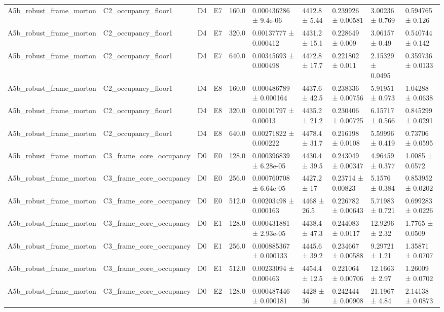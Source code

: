 \begin{table}
\begin{tabular}{llllllllll}
A5b\_robust\_frame\_morton & C2\_occupancy\_floor1 & D4 & E7 & 160.0 & 0.000436286 ± 9.4e-06 & 4412.8 ± 5.44 & 0.239926 ± 0.00581 & 3.00236 ± 0.769 & 0.594765 ± 0.126 \\
A5b\_robust\_frame\_morton & C2\_occupancy\_floor1 & D4 & E7 & 320.0 & 0.00137777 ± 0.000412 & 4431.2 ± 15.1 & 0.228649 ± 0.009 & 3.06157 ± 0.49 & 0.540744 ± 0.142 \\
A5b\_robust\_frame\_morton & C2\_occupancy\_floor1 & D4 & E7 & 640.0 & 0.00345693 ± 0.000498 & 4472.8 ± 17.7 & 0.221802 ± 0.011 & 2.15329 ± 0.0495 & 0.359736 ± 0.0133 \\
A5b\_robust\_frame\_morton & C2\_occupancy\_floor1 & D4 & E8 & 160.0 & 0.000486789 ± 0.000164 & 4437.6 ± 42.5 & 0.238336 ± 0.00756 & 5.91951 ± 0.973 & 1.04288 ± 0.0638 \\
A5b\_robust\_frame\_morton & C2\_occupancy\_floor1 & D4 & E8 & 320.0 & 0.00101797 ± 0.00013 & 4435.2 ± 21.2 & 0.230406 ± 0.00725 & 6.15717 ± 0.566 & 0.845299 ± 0.0291 \\
A5b\_robust\_frame\_morton & C2\_occupancy\_floor1 & D4 & E8 & 640.0 & 0.00271822 ± 0.000222 & 4478.4 ± 31.7 & 0.216198 ± 0.0108 & 5.59996 ± 0.419 & 0.73706 ± 0.0595 \\
A5b\_robust\_frame\_morton & C3\_frame\_core\_occupancy & D0 & E0 & 128.0 & 0.000396839 ± 6.28e-05 & 4430.4 ± 39.5 & 0.243049 ± 0.00347 & 4.96459 ± 0.377 & 1.0085 ± 0.0572 \\
A5b\_robust\_frame\_morton & C3\_frame\_core\_occupancy & D0 & E0 & 256.0 & 0.000760708 ± 6.64e-05 & 4427.2 ± 17 & 0.23714 ± 0.00823 & 5.1576 ± 0.384 & 0.853952 ± 0.0202 \\
A5b\_robust\_frame\_morton & C3\_frame\_core\_occupancy & D0 & E0 & 512.0 & 0.00203498 ± 0.000163 & 4468 ± 26.5 & 0.226782 ± 0.00643 & 5.71983 ± 0.721 & 0.699283 ± 0.0226 \\
A5b\_robust\_frame\_morton & C3\_frame\_core\_occupancy & D0 & E1 & 128.0 & 0.000431881 ± 2.93e-05 & 4438.4 ± 47.3 & 0.244083 ± 0.0117 & 12.9296 ± 2.32 & 1.7765 ± 0.0509 \\
A5b\_robust\_frame\_morton & C3\_frame\_core\_occupancy & D0 & E1 & 256.0 & 0.000885367 ± 0.000133 & 4445.6 ± 39.2 & 0.234667 ± 0.00588 & 9.29721 ± 1.21 & 1.35871 ± 0.0707 \\
A5b\_robust\_frame\_morton & C3\_frame\_core\_occupancy & D0 & E1 & 512.0 & 0.00233094 ± 0.000463 & 4454.4 ± 12.5 & 0.221064 ± 0.00706 & 12.1663 ± 2.97 & 1.26009 ± 0.0702 \\
A5b\_robust\_frame\_morton & C3\_frame\_core\_occupancy & D0 & E2 & 128.0 & 0.000487446 ± 0.000181 & 4428 ± 36 & 0.242444 ± 0.00908 & 21.1967 ± 4.84 & 2.14138 ± 0.0873 \\

\end{tabular}
\end{table}

